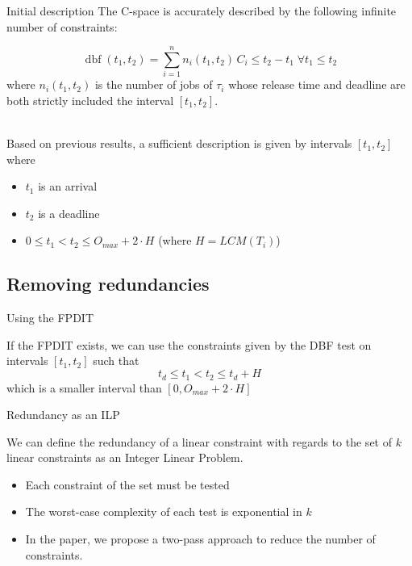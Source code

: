 \documentclass{beamer}
\newcommand{\dbf}[1]{\operatorname{dbf}(#1)}
\begin{document}
	\begin{frame}{Initial description}
		The C-space is accurately described by the following infinite number of constraints:

        $$\dbf{t_1, t_2} = \sum_{i=1}^{n} n_i(t_1, t_2) \, C_i \leq t_2 - t_1 \; \forall t_1 \leqslant  t_2$$
        where $n_i(t_1, t_2)$ is the number of jobs of $\tau_i$ whose release time and deadline are both strictly included the interval $[t_1, t_2]$.

        ~\\

        Based on previous results, a sufficient description is given by intervals $[t_1, t_2]$ where
        \begin{itemize}
            \item $t_1$ is an arrival
            \item $t_2$ is a deadline
            \item $0 \leqslant t_1 < t_2 \leqslant O_{max} + 2 \cdot H$ (where $H = LCM(T_i)$)
        \end{itemize}
	\end{frame}

    \subsection{Removing redundancies}

    \begin{frame}{Using the FPDIT}

        If the FPDIT exists, we can use the constraints given by the DBF test on intervals $[t_1, t_2]$ such that
        $$t_d \leqslant t_1 < t_2 \leqslant t_d + H$$
        which is a smaller interval than $[0, O_{max} + 2 \cdot H]$

    \end{frame}

    \begin{frame}{Redundancy as an ILP}

    We can define the redundancy of a linear constraint with regards to the set of $k$ linear constraints as an Integer Linear Problem.

        \begin{itemize}
            \item Each constraint of the set must be tested
            \item The worst-case complexity of each test is exponential in $k$
            \item In the paper, we propose a two-pass approach to reduce the number of constraints.
        \end{itemize}

    \end{frame}
\end{document}
